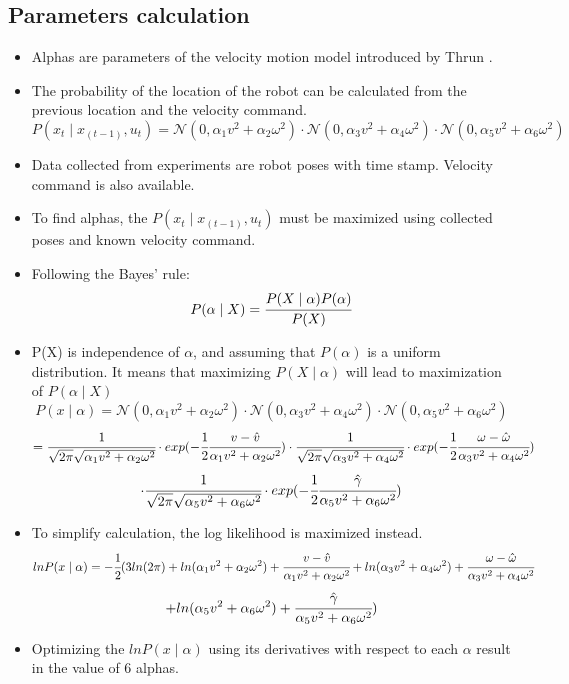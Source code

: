 \documentclass[paper=a4, fontsize=11pt]{scrartcl} %
\begin{document}
    \subsection{Parameters calculation}
    \begin{itemize}
    	\item Alphas are parameters of the velocity motion model introduced by Thrun \cite{Thrun}.
    	\item The probability of the location of the robot can be calculated from the previous location and the velocity command.
    	\[
    		P(x_t \mid x_(t-1),u_t) = \mathcal{N}(0,\alpha_1 v^2 + \alpha_2 \omega^2) \cdot \mathcal{N}(0,\alpha_3 v^2 + \alpha_4 \omega^2) \cdot \mathcal{N}(0,\alpha_5 v^2 + \alpha_6 \omega^2) 
    	\]
    	\item Data collected from experiments are robot poses with time stamp. Velocity command is also available.
    	\item To find alphas, the $P(x_t \mid x_(t-1),u_t)$ must be maximized using collected poses and known velocity command.
    	\item Following the Bayes' rule:
    	\[
    		P(\alpha \mid X) = \cfrac{P(X \mid \alpha) P(\alpha)}{P(X)}
    	\]
    	\item P(X) is independence of $\alpha$, and assuming that $P(\alpha)$ is a uniform distribution. It means that maximizing $P(X \mid \alpha)$ will lead to maximization of $P(\alpha \mid X)$
    	\[
    		P(x \mid \alpha) = \mathcal{N}(0,\alpha_1 v^2 + \alpha_2 \omega^2) \cdot \mathcal{N}(0,\alpha_3 v^2 + \alpha_4 \omega^2) \cdot \mathcal{N}(0,\alpha_5 v^2 + \alpha_6 \omega^2)
    	\]
    	\[
			= \cfrac{1}{\sqrt{2\pi} \sqrt{\alpha_1 v^2 + \alpha_2 \omega^2}} \cdot exp(-\cfrac{1}{2}\cfrac{v - \hat{v}}{\alpha_1 v^2 + \alpha_2 \omega^2}) \cdot \cfrac{1}{\sqrt{2\pi} \sqrt{\alpha_3 v^2 + \alpha_4 \omega^2}} \cdot exp(-\cfrac{1}{2}\cfrac{\omega - \hat{\omega}}{\alpha_3 v^2 + \alpha_4 \omega^2}) 
		\]
		\[	
			\cdot \cfrac{1}{\sqrt{2\pi} \sqrt{\alpha_5 v^2 + \alpha_6 \omega^2}} \cdot exp(-\cfrac{1}{2}\cfrac{\hat{\gamma}}{\alpha_5 v^2 + \alpha_6 \omega^2})
    	\]
    	
    	\item To simplify calculation, the log likelihood is maximized instead.
    	\[
    		ln P(x \mid \alpha) = - \cfrac{1}{2}( 3ln(2\pi) + ln(\alpha_1 v^2 + \alpha_2 \omega^2) + \cfrac{v - \hat{v}}{\alpha_1 v^2 + \alpha_2 \omega^2} + ln(\alpha_3 v^2 + \alpha_4 \omega^2) + \cfrac{\omega - \hat{\omega}}{\alpha_3 v^2 + \alpha_4 \omega^2} 
    	\]
    	\[
    		+ ln(\alpha_5 v^2 + \alpha_6 \omega^2) + \cfrac{\hat{\gamma}}{\alpha_5 v^2 + \alpha_6 \omega^2})
    	\]
    	\item Optimizing the $ln P(x \mid \alpha)$ using its derivatives with respect to each $\alpha$ result in the value of 6 alphas.
    \end{itemize}
   
\end{document}
